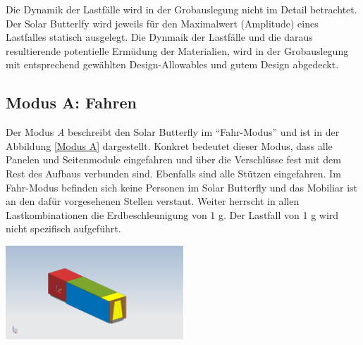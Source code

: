 Die Dynamik der Lastfälle wird in der Grobauslegung nicht im Detail betrachtet. Der Solar Butterlfy wird jeweils für den Maximalwert (Amplitude) eines Lastfalles statisch ausgelegt. Die Dynmaik der Lastfälle und die daraus resultierende potentielle Ermüdung der Materialien, wird in der Grobauslegung mit entsprechend gewählten Design-Allowables und gutem Design abgedeckt.

\subsection{Modus A: Fahren}
Der Modus \emph{A} beschreibt den Solar Butterfly im ``Fahr-Modus'' und ist in der Abbildung \ref{Modus A} dargestellt. Konkret bedeutet dieser Modus, dass alle Panelen und Seitenmodule eingefahren und über die Verschlüsse fest mit dem Rest des Aufbaus verbunden sind. Ebenfalls sind alle Stützen eingefahren. Im Fahr-Modus befinden sich keine Personen im Solar Butterfly und das Mobiliar ist an den dafür vorgesehenen Stellen verstaut. Weiter herrscht in allen Lastkombinationen die Erdbeschleunigung von 1 g. Der Lastfall von 1 g wird nicht spezifisch aufgeführt.

\begin{center}
  \includegraphics[width=0.5\textwidth]{04_Figures/A.png}
  \label{Modus A}
\end{center}


